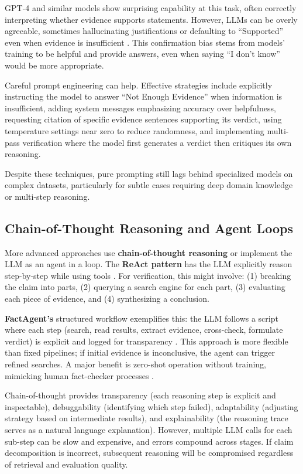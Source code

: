 \documentclass[12pt,a4paper]{article}
\begin{document}
GPT-4 and similar models show surprising capability at this task, often correctly interpreting whether evidence supports statements. However, LLMs can be overly agreeable, sometimes hallucinating justifications or defaulting to ``Supported'' even when evidence is insufficient \citep{zhang2023siren}. This confirmation bias stems from models' training to be helpful and provide answers, even when saying ``I don't know'' would be more appropriate.

Careful prompt engineering can help. Effective strategies include explicitly instructing the model to answer ``Not Enough Evidence'' when information is insufficient, adding system messages emphasizing accuracy over helpfulness, requesting citation of specific evidence sentences supporting its verdict, using temperature settings near zero to reduce randomness, and implementing multi-pass verification where the model first generates a verdict then critiques its own reasoning.

Despite these techniques, pure prompting still lags behind specialized models on complex datasets, particularly for subtle cases requiring deep domain knowledge or multi-step reasoning.

\subsection{Chain-of-Thought Reasoning and Agent Loops}

More advanced approaches use \textbf{chain-of-thought reasoning} or implement the LLM as an agent in a loop. The \textbf{ReAct pattern} has the LLM explicitly reason step-by-step while using tools \citep{yao2023react}. For verification, this might involve: (1) breaking the claim into parts, (2) querying a search engine for each part, (3) evaluating each piece of evidence, and (4) synthesizing a conclusion.

\textbf{FactAgent's} structured workflow exemplifies this: the LLM follows a script where each step (search, read results, extract evidence, cross-check, formulate verdict) is explicit and logged for transparency \citep{hysonlab2025factagent}. This approach is more flexible than fixed pipelines; if initial evidence is inconclusive, the agent can trigger refined searches. A major benefit is zero-shot operation without training, mimicking human fact-checker processes \citep{hysonlab2025factagent}.

Chain-of-thought provides transparency (each reasoning step is explicit and inspectable), debuggability (identifying which step failed), adaptability (adjusting strategy based on intermediate results), and explainability (the reasoning trace serves as a natural language explanation). However, multiple LLM calls for each sub-step can be slow and expensive, and errors compound across stages. If claim decomposition is incorrect, subsequent reasoning will be compromised regardless of retrieval and evaluation quality.
\end{document}
